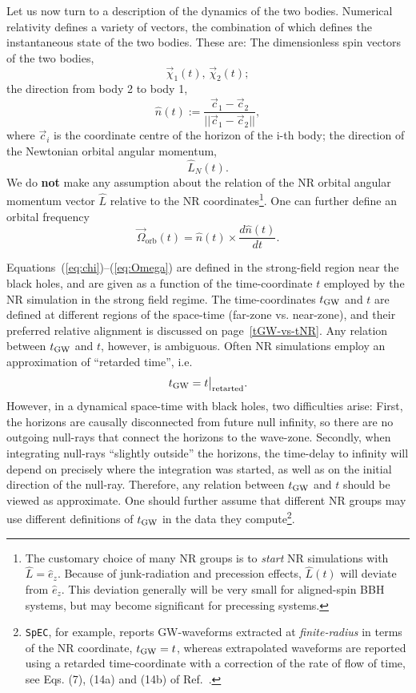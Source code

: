 \documentclass[11pt,tightenlines,article,amssymb,amsmath,amsfonts,superscriptaddress,nofootinbib]{revtex4}
\newcommand{\EzNR}{\hat e_z}
\newcommand{\nNR}{\hat{n}}
\newcommand{\lNR}{\hat L}
\newcommand{\tGW}{t_{\rm GW}}
\begin{document}
Let us now turn to a description of the dynamics of the two bodies.
Numerical relativity defines a variety of vectors, the combination of
which defines the instantaneous state of the two bodies.  These are:
The dimensionless spin vectors of the two bodies,
\begin{equation}\label{eq:chi}
  \vec\chi_1(t),\, \vec\chi_2(t);
\end{equation}
the direction from body 2 to body 1,
\begin{equation}
\label{eq:nhat}
  \nNR(t) := \frac{\vec{c}_1 - \vec{c}_2}{|| \vec{c}_1 - \vec{c}_2 ||},
\end{equation}
where $\vec{c}_i$ is the coordinate centre of the horizon of the i-th body;
the direction of the Newtonian orbital angular momentum,
\begin{equation}
  \hat L_N(t).
\end{equation}
We do {\bf not} make any assumption about the relation of the
NR orbital angular momentum vector $\lNR$ relative to the NR
coordinates\footnote{The customary choice of many NR groups is to
  \emph{start} NR simulations with $\lNR=\EzNR$.  Because of
  junk-radiation and precession effects, $\lNR(t)$ will deviate from
  $\EzNR$.  This deviation generally will be very small for
  aligned-spin BBH systems, but may become significant for precessing
  systems.}.
One can further define an orbital frequency
\begin{equation}\label{eq:Omega}
  \vec\Omega_\mathrm{orb}(t) = \nNR(t) \times \frac{d\nNR(t)}{dt}.
\end{equation}

Equations~(\ref{eq:chi})--(\ref{eq:Omega}) are defined in the
strong-field region near the black holes, and are given as a function
of the time-coordinate $t$ employed by the NR simulation in the strong
field regime. 
The time-coordinates $\tGW$ and $t$ are defined at different regions
of the space-time (far-zone vs. near-zone), and their preferred relative
alignment is discussed on page~\ref{tGW-vs-tNR}. Any relation between $\tGW$ and
$t$, however, is ambiguous.  Often NR simulations employ an approximation of
``retarded time'', i.e.
\begin{equation}
  \label{eq:tretarted}
  \tGW = t\big|_{\rm retarted}.
\end{equation}
However, in a dynamical space-time with black holes, two difficulties
arise: First, the horizons are causally disconnected from future null
infinity, so there are no outgoing null-rays that connect the horizons
to the wave-zone.  Secondly, when integrating null-rays ``slightly
outside'' the horizons, the time-delay to infinity will depend on
precisely where the integration was started, as well as on the initial
direction of the null-ray.  Therefore, any relation between $\tGW$ and
$t$ should be viewed as approximate. One should further assume that
different NR groups may use different definitions of $\tGW$ in the
data they compute\footnote{{\tt SpEC}, for example, reports GW-waveforms
extracted at \emph{finite-radius} in terms of the NR coordinate,
$\tGW=t$, whereas extrapolated waveforms are reported using a retarded
time-coordinate with a correction of the rate of flow of time, see
Eqs. (7), (14a) and (14b) of Ref.~\cite{Boyle:2009vi}.}.
\end{document}
